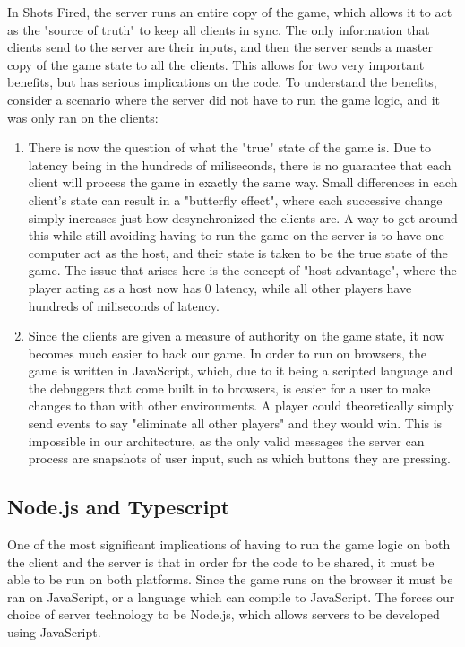 \documentclass[12pt]{report}
\begin{document}
In Shots Fired, the server runs an entire copy of the game, which allows it to
act as the "source of truth" to keep all clients in sync.  The only information
that clients send to the server are their inputs, and then the server sends a
master copy of the game state to all the clients.  This allows for two very
important benefits, but has serious implications on the code.  To understand the
benefits, consider a scenario where the server did not have to run the game
logic, and it was only ran on the clients:  
\begin{enumerate}
    \item There is now the question of what the "true" state of the game is.
        Due to latency being in the hundreds of miliseconds, there is no
        guarantee that each client will process the game in exactly the same
        way.  Small differences in each client's state can result in a
        "butterfly effect", where each successive change simply increases just
        how desynchronized the clients are.  A way to get around this while
        still avoiding having to run the game on the server is to have one
        computer act as the host, and their state is taken to be the true state
        of the game.  The issue that arises here is the concept of "host
        advantage", where the player acting as a host now has 0 latency, while
        all other players have hundreds of miliseconds of latency.  
    \item Since the clients are given a measure of authority on the game state,
        it now becomes much easier to hack our game.  In order to run on
        browsers, the game is written in JavaScript, which, due to it being a
        scripted language and the debuggers that come built in to browsers, is
        easier for a user to make changes to than with other environments.  A
        player could theoretically simply send events to say "eliminate all
        other players" and they would win.  This is impossible in our
        architecture, as the only valid messages the server can process are
        snapshots of user input, such as which buttons they are pressing.
\end{enumerate}

\subsection{Node.js and Typescript}
One of the most significant implications of having to run the game logic on both
the client and the server is that in order for the code to be shared, it must be
able to be run on both platforms.  Since the game runs on the browser it must
be ran on JavaScript, or a language which can compile to JavaScript.  The forces
our choice of server technology to be Node.js, which allows servers to be
developed using JavaScript.
\end{document}
